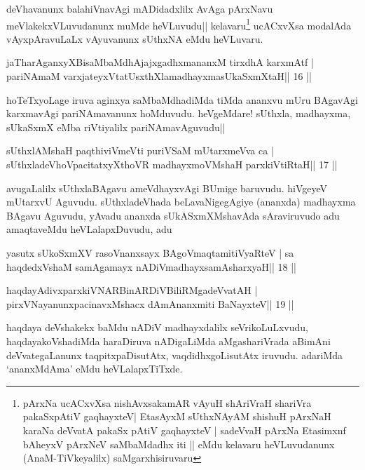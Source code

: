 \begin{artha}
deVhavanunx balahiVnavAgi mADidadxlilx AvAga pArxNavu
meVlakekxVLuvudanunx muMde heVLuvudu|| kelavaru\footnote{pArxNa
  ucACxvXsa nishAvxsakamAR vAyuH shAriVraH shariVra pakaSxpAtiV
  gaqhayxteV| EtasAyxM sUthxNAyAM shishuH pArxNaH karaNa deVvatA
  pakaSx pAtiV gaqhayxteV | sadeVvaH pArxNa Etasimxnf bAheyxV pArxNeV
  saMbaMdadhx iti || eMdu kelavaru heVLuvudanunx (AnaM-TiVkeyalilx) saMgarxhisiruvaru} ucACxvXsa modalAda
vAyxpAravuLaLx vAyuvanunx sUthxNA eMdu heVLuvaru.
\end{artha}

\begin{shl}
jaTharAganxyXBisaMbaMdhAjajxgadhxmananxM tirxdhA karxmAtf |
pariNAmaM varxjateyxVtatUsxthXlamadhayxmasUkaSxmXtaH\hfill || 16 ||
\end{shl}

\begin{artha}
hoTeTxyoLage iruva aginxya saMbaMdhadiMda tiMda ananxvu mUru BAgavAgi
karxmavAgi pariNAmavanunx hoMduvudu. heVgeMdare! sUthxla, madhayxma,
sUkaSxmX eMba riVtiyalilx pariNAmavAguvudu|| 
\end{artha}

\begin{shl}
sUthxlAMshaH paqthiviVmeVti puriVSaM mUtarxmeVva ca |
sUthxladeVhoVpacitatxyXthoVR madhayxmoVM\s shaH parxkiVtiRtaH\hfill || 17 ||
\end{shl}

\begin{artha}
avugaLalilx sUthxlaBAgavu ameVdhayxvAgi BUmige baruvudu. hiVgeyeV mUtarxvU
Aguvudu. sUthxladeVhada beLavaNigegAgiye (ananxda) madhayxma BAgavu
Aguvudu, yAvadu ananxda sUkASxmXMshavAda sAraviruvudo adu amaqtaveMdu
heVLalapxDuvudu, adu 
\end{artha}

\begin{shl}
yasutx sUkoSxmXV rasoV\s nanxsayx BAgoV\s maqtamitiVyaRteV |
sa haqdedxVshaM samAgamayx nADiVmadhayxsamAsharxyaH\hfill || 18 ||
\end{shl}

\begin{shl}
haqdayAdivxparxkiVNARBinARDiVBiliRMgadeVvatAH |
pirxVNayanunxpacinavxMshacx dAmAnanxmiti BaNayxteV\hfill || 19 ||
\end{shl}

\begin{artha}
haqdaya deVshakekx baMdu nADiV madhayxdalilx seVrikoLuLxvudu, haqdayakoVshadiMda haraDiruva nADigaLiMda aMgashariVrada aBimAni deVvategaLanunx taqpitxpaDisutAtx, vaqdidhxgoLisutAtx iruvudu. adariMda `ananxMdAma' eMdu heVLalapxTiTxde.
\end{artha}

